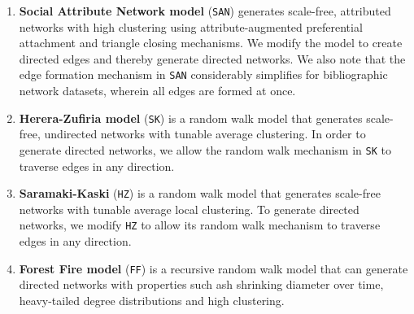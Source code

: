 \begin{enumerate}
	\item{\textbf{Social Attribute Network model}} \cite{gong2012evolution} (\texttt{SAN}) generates
	scale-free, attributed networks with high clustering using attribute-augmented
	preferential attachment and triangle closing mechanisms.
	We modify the model to create directed edges and thereby generate directed networks. We also note that
	the edge formation mechanism in \texttt{SAN} considerably simplifies for bibliographic network datasets,
	wherein all edges are formed at once.

	\item{\textbf{Herera-Zufiria model}} \cite{saramaki2004scale} (\texttt{SK})
	is a random walk model that generates scale-free, undirected networks with tunable average clustering.
	In order to generate directed networks, we allow the random walk mechanism in \texttt{SK} to traverse edges in any direction.

	\item{\textbf{Saramaki-Kaski}} \cite{herrera2011generating} (\texttt{HZ}) is a random walk model
	that generates scale-free networks with tunable average local clustering. To generate directed networks,
	we modify \texttt{HZ} to allow its random walk mechanism to traverse edges in any direction.

	\item{\textbf{Forest Fire model}} \cite{leskovec2005graphs} (\texttt{FF}) is a recursive random walk model
	that can generate directed networks with properties such ash shrinking diameter over time,
	heavy-tailed degree distributions and high clustering.
\end{enumerate}

